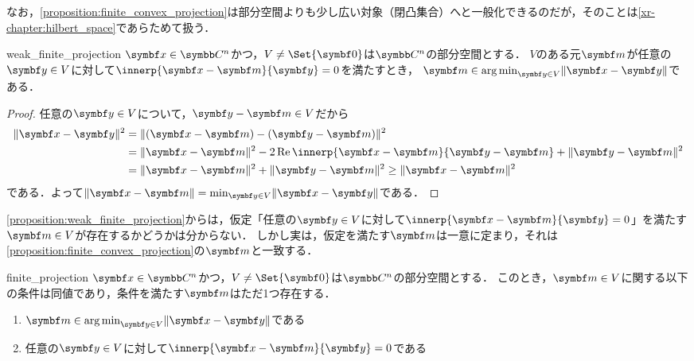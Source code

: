 \documentclass[../../main]{subfiles}
\begin{document}
なお，\cref{proposition:finite_convex_projection}は部分空間よりも少し広い対象（閉凸集合）へと一般化できるのだが，そのことは\cref{xr-chapter:hilbert_space}であらためて扱う．

\begin{proposition}{}{weak_finite_projection}
  \(\vect{x}\in\numset{C}^n\)かつ，\(V\neq\Set{\zvec}\)は\(\numset{C}^n\)の部分空間とする．
  \(V\)のある元\(\vect{m}\)が任意の\(\vect{y}\in V\)に対して\(\innerp{\vect{x}-\vect{m}}{\vect{y}}=0\)を満たすとき，
  \(\vect{m}\in\argmin_{\vect{y}\in V}\vnorm{\vect{x}-\vect{y}}\)である．
\end{proposition}

\begin{proof}
  任意の\(\vect{y}\in V\)について，\(\vect{y}-\vect{m}\in V\)だから
  \begin{align*}
    \vnorm{\vect{x}-\vect{y}}^2 &= \vnorm{(\vect{x}-\vect{m})-(\vect{y}-\vect{m})}^2 \\
    &= \vnorm{\vect{x}-\vect{m}}^2-2\rpart\innerp{\vect{x}-\vect{m}}{\vect{y}-\vect{m}}+\vnorm{\vect{y}-\vect{m}}^2 \\
    &= \vnorm{\vect{x}-\vect{m}}^2+\vnorm{\vect{y}-\vect{m}}^2 \geq \vnorm{\vect{x}-\vect{m}}^2
  \end{align*}
  である．よって\(\vnorm{\vect{x}-\vect{m}}=\min_{\vect{y}\in V}\vnorm{\vect{x}-\vect{y}}\)である．
\end{proof}

\cref{proposition:weak_finite_projection}からは，仮定「任意の\(\vect{y}\in V\)に対して\(\innerp{\vect{x}-\vect{m}}{\vect{y}}=0\)」を満たす\(\vect{m}\in V\)が存在するかどうかは分からない．
しかし実は，仮定を満たす\(\vect{m}\)は一意に定まり，それは\cref{proposition:finite_convex_projection}の\(\vect{m}\)と一致する．

\begin{proposition}{}{finite_projection}
  \(\vect{x}\in\numset{C}^n\)かつ，\(V\neq\Set{\zvec}\)は\(\numset{C}^n\)の部分空間とする．
  このとき，\(\vect{m}\in V\)に関する以下の条件は同値であり，条件を満たす\(\vect{m}\)はただ1つ存在する．
  \begin{enumerate}
    \item \(\vect{m}\in\argmin_{\vect{y}\in V}\vnorm{\vect{x}-\vect{y}}\)である
    \item 任意の\(\vect{y}\in V\)に対して\(\innerp{\vect{x}-\vect{m}}{\vect{y}}=0\)である
  \end{enumerate}
\end{proposition}
\end{document}
